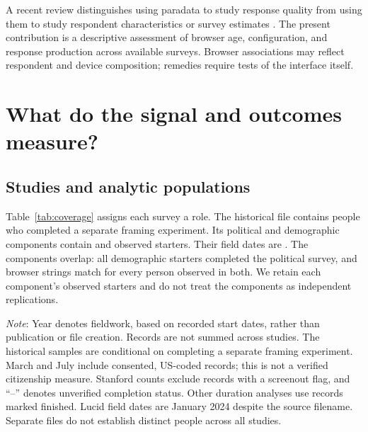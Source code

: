 \documentclass[11pt]{article}
\begin{document}
A recent review distinguishes using paradata to study response quality from using them to study respondent characteristics or survey estimates \citep{vehovar2026}. The present contribution is a descriptive assessment of browser age, configuration, and response production across available surveys. Browser associations may reflect respondent and device composition; remedies require tests of the interface itself.

\section{What do the signal and outcomes measure?}

\subsection{Studies and analytic populations}

Table~\ref{tab:coverage} assigns each survey a role. The historical file contains \MergedN{} people who completed a separate framing experiment. Its political and demographic components contain \PolN{} and \DemN{} observed starters. Their field dates are \FieldDates{}. The components overlap: all demographic starters completed the political survey, and browser strings match for every person observed in both. We retain each component's observed starters and do not treat the components as independent replications.

\begin{table}[htbp]
\centering
\caption{Available records and the questions they can address.}
\label{tab:coverage}
\small

\par\smallskip
\begin{minipage}{\linewidth}\footnotesize
\emph{Note}: Year denotes fieldwork, based on recorded start dates, rather than publication or file creation. Records are not summed across studies. The historical samples are conditional on completing a separate framing experiment. March and July include consented, US-coded records; this is not a verified citizenship measure. Stanford counts exclude records with a screenout flag, and ``--'' denotes unverified completion status. Other duration analyses use records marked finished. Lucid field dates are January 2024 despite the source filename. Separate files do not establish distinct people across all studies.
\end{minipage}
\end{table}
\end{document}

